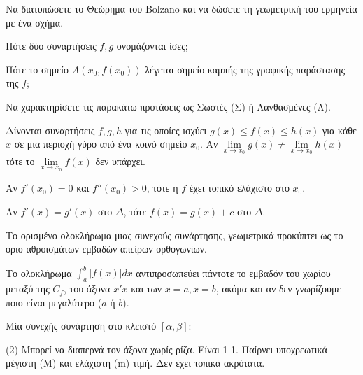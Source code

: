 \documentclass[11pt,a4paper]{article}
\newcommand{\kerkissans}[1]{{\fontfamily{maksf}\selectfont \textbf{#1}}}
\renewcommand{\textdexiakeraia}{}
\newcommand{\dint}{\displaystyle\int}
\newcommand\themanum{A}
\newcounter{thema}[section]
\renewcommand{\thethema}{\arabic{thema}}
\newcommand{\Thema}{\refstepcounter{thema}{\textbf{\textcolor{black}{\faPenSquare\ \  \large \kerkissans{\textbf{\thethemaο\hspace{2mm}Διαγώνισμα - Θέμα \themanum}}}}}\hspace{0mm}}{}
\newenvironment{thema}[1]
{\begin{tcolorbox}[title=\Thema\kerkissans{\textbf{\large{  #1}}},breakable,
enhanced standard,titlerule=0pt,toprule=0pt, rightrule=0pt, bottomrule=0pt,
colback=white,left=0mm,top=1mm,bottom=0mm,
boxrule=0pt,
colframe=white,leftrule=0mm,sharp corners,coltitle=black]
\renewcommand{\themanum}{#1}}
{\end{tcolorbox}}
\begin{document}
\begin{thema}{A}
\begin{erwthma}
    \item Να διατυπώσετε το Θεώρημα του Bolzano και να δώσετε τη γεωμετρική του ερμηνεία με ένα σχήμα.
    \item Πότε δύο συναρτήσεις $f, g$ ονομάζονται ίσες;
    \item Πότε το σημείο $A(x_0, f(x_0))$ λέγεται σημείο καμπής της γραφικής παράστασης της $f$;
    \item Να χαρακτηρίσετε τις παρακάτω προτάσεις ως Σωστές (Σ) ή Λανθασμένες (Λ).
    \begin{alist}
        \item Δίνονται συναρτήσεις $f,g,h$ για τις οποίες ισχύει $g(x)\leq f(x)\leq h(x)$ για κάθε $x$ σε μια περιοχή γύρο από ένα κοινό σημείο $x_0$. Αν $\lim\limits_{x\to x_0}{g(x)}\neq\lim\limits_{x\to x_0}{h(x)}$ τότε το $\lim\limits_{x\to x_0}{f(x)}$ δεν υπάρχει.
        \item Αν $f'(x_0) = 0$ και $f''(x_0) > 0$, τότε η $f$ έχει τοπικό ελάχιστο στο $x_0$.
        \item Αν $f'(x) = g'(x)$ στο $\Delta$, τότε $f(x) = g(x) + c$ στο $\Delta$.
        \item Το ορισμένο ολοκλήρωμα μιας συνεχούς συνάρτησης, γεωμετρικά προκύπτει ως το όριο αθροισμάτων εμβαδών απείρων ορθογωνίων.
        \item Το ολοκλήρωμα $\dint_a^b |f(x)| dx$ αντιπροσωπεύει πάντοτε το εμβαδόν του χωρίου μεταξύ της $C_{f}$, του άξονα $x'x$ και των $x=a, x=b$, ακόμα και αν δεν γνωρίζουμε ποιο είναι μεγαλύτερο ($a$ ή $b$).
    \end{alist}
    \item Μία συνεχής συνάρτηση στο κλειστό $[\alpha, \beta]$:
    \begin{tasks}[label=\let\textdexiakeraia\relax\alph*.](2)
        \task Μπορεί να διαπερνά τον άξονα χωρίς ρίζα.
        \task Είναι 1-1.
        \task Παίρνει υποχρεωτικά μέγιστη (Μ) και ελάχιστη (m) τιμή.
        \task Δεν έχει τοπικά ακρότατα.
    \end{tasks}
\end{erwthma}
\end{thema}
\vspace{1cm}
\end{document}
